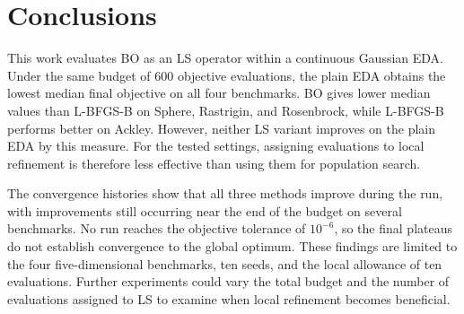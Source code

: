 \section{Conclusions}

This work evaluates BO as an LS operator within a continuous Gaussian EDA. Under the same budget of 600 objective evaluations, the plain EDA obtains the lowest median final objective on all four benchmarks. BO gives lower median values than L-BFGS-B on Sphere, Rastrigin, and Rosenbrock, while L-BFGS-B performs better on Ackley. However, neither LS variant improves on the plain EDA by this measure. For the tested settings, assigning evaluations to local refinement is therefore less effective than using them for population search.

The convergence histories show that all three methods improve during the run, with improvements still occurring near the end of the budget on several benchmarks. No run reaches the objective tolerance of $10^{-6}$, so the final plateaus do not establish convergence to the global optimum. These findings are limited to the four five-dimensional benchmarks, ten seeds, and the local allowance of ten evaluations. Further experiments could vary the total budget and the number of evaluations assigned to LS to examine when local refinement becomes beneficial.
